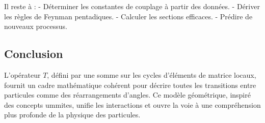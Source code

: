 \documentclass[11pt]{article}
\begin{document}
Il reste à : - Déterminer les constantes de couplage à partir des
données. - Dériver les règles de Feynman pentadiques. - Calculer les
sections efficaces. - Prédire de nouveaux processus.

\hypertarget{conclusion}{%
\subsection{Conclusion}\label{conclusion}}

L'opérateur \(T\), défini par une somme sur les cycles d'éléments de
matrice locaux, fournit un cadre mathématique cohérent pour décrire
toutes les transitions entre particules comme des réarrangements
d'angles. Ce modèle géométrique, inspiré des concepts ummites, unifie
les interactions et ouvre la voie à une compréhension plus profonde de
la physique des particules.
\end{document}
